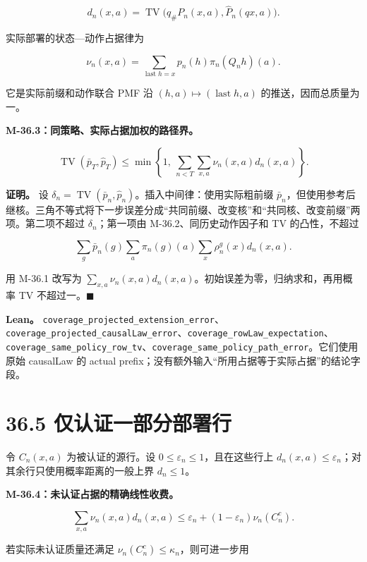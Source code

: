 \documentclass[
  11pt,
  oneside]{book}
\begin{document}
\[d_n(x,a)=\operatorname{TV}\bigl(q_\#P_n(x,a),\widehat P_n(qx,a)\bigr).\]

实际部署的状态---动作占据律为

\[\nu_n(x,a)=
\sum_{\operatorname{last}h=x}p_n(h)\pi_n(Q_nh)(a).\]

它是实际前缀和动作联合 PMF 沿 \((h,a)\mapsto(\operatorname{last}h,a)\) 的推送，因而总质量为一。

\hypertarget{m-36-3}{}\label{m-36-3}

\textbf{M-36.3：同策略、实际占据加权的路径界。}

\[\operatorname{TV}(\bar p_T,\widehat p_T)
\le
\min\left\{1,\ \sum_{n<T}\sum_{x,a}\nu_n(x,a)d_n(x,a)\right\}.\]

\textbf{证明。} 设 \(\delta_n=\operatorname{TV}(\bar p_n,\widehat p_n)\)。插入中间律：使用实际粗前缀 \(\bar p_n\)，但使用参考后继核。三角不等式将下一步误差分成``共同前缀、改变核''和``共同核、改变前缀''两项。第二项不超过 \(\delta_n\)；第一项由 M-36.2、同历史动作因子和 TV 的凸性，不超过

\[\sum_g\bar p_n(g)\sum_a\pi_n(g)(a)\sum_x\rho_n^g(x)d_n(x,a).\]

用 M-36.1 改写为 \(\sum_{x,a}\nu_n(x,a)d_n(x,a)\)。初始误差为零，归纳求和，再用概率 TV 不超过一。\(\blacksquare\)

\textbf{Lean。} \nolinkurl{coverage_projected_extension_error}、\nolinkurl{coverage_projected_causalLaw_error}、\nolinkurl{coverage_rowLaw_expectation}、\nolinkurl{coverage_same_policy_row_tv}、\nolinkurl{coverage_same_policy_path_error}。它们使用原始 causalLaw 的 actual prefix；没有额外输入``所用占据等于实际占据''的结论字段。

\section{36.5 仅认证一部分部署行}\label{ux4ec5ux8ba4ux8bc1ux4e00ux90e8ux5206ux90e8ux7f72ux884c}

令 \(C_n(x,a)\) 为被认证的源行。设 \(0\le\varepsilon_n\le1\)，且在这些行上 \(d_n(x,a)\le\varepsilon_n\)；对其余行只使用概率距离的一般上界 \(d_n\le1\)。

\hypertarget{m-36-4}{}\label{m-36-4}

\textbf{M-36.4：未认证占据的精确线性收费。}

\[\sum_{x,a}\nu_n(x,a)d_n(x,a)
\le
\varepsilon_n+(1-\varepsilon_n)\nu_n(C_n^c).\]

若实际未认证质量还满足 \(\nu_n(C_n^c)\le\kappa_n\)，则可进一步用
\end{document}
